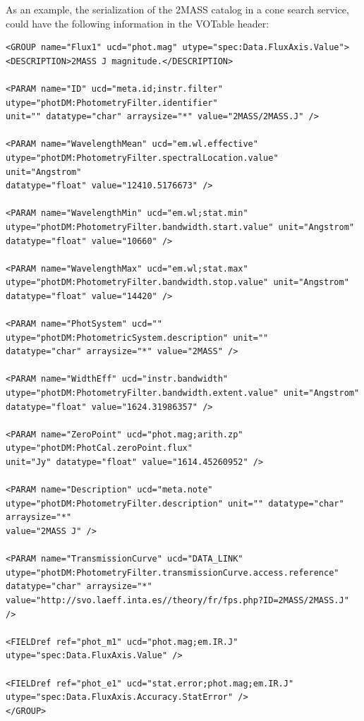 \documentclass[11pt,a4paper]{ivoa}
\begin{document}
\begin{appendices}
As an example, the serialization of the 2MASS catalog in a cone search service, could have the following information in the VOTable header:
\par

\begin{verbatim}
<GROUP name="Flux1" ucd="phot.mag" utype="spec:Data.FluxAxis.Value">
<DESCRIPTION>2MASS J magnitude.</DESCRIPTION>

<PARAM name="ID" ucd="meta.id;instr.filter"
utype="photDM:PhotometryFilter.identifier"
unit="" datatype="char" arraysize="*" value="2MASS/2MASS.J" />

<PARAM name="WavelengthMean" ucd="em.wl.effective"
utype="photDM:PhotometryFilter.spectralLocation.value"
unit="Angstrom"
datatype="float" value="12410.5176673" />

<PARAM name="WavelengthMin" ucd="em.wl;stat.min"
utype="photDM:PhotometryFilter.bandwidth.start.value" unit="Angstrom"
datatype="float" value="10660" />

<PARAM name="WavelengthMax" ucd="em.wl;stat.max"
utype="photDM:PhotometryFilter.bandwidth.stop.value" unit="Angstrom"
datatype="float" value="14420" />

<PARAM name="PhotSystem" ucd="" utype="photDM:PhotometricSystem.description" unit=""
datatype="char" arraysize="*" value="2MASS" />

<PARAM name="WidthEff" ucd="instr.bandwidth"
utype="photDM:PhotometryFilter.bandwidth.extent.value" unit="Angstrom"
datatype="float" value="1624.31986357" />

<PARAM name="ZeroPoint" ucd="phot.mag;arith.zp" utype="photDM:PhotCal.zeroPoint.flux"
unit="Jy" datatype="float" value="1614.45260952" />

<PARAM name="Description" ucd="meta.note"
utype="photDM:PhotometryFilter.description" unit="" datatype="char" arraysize="*"
value="2MASS J" />

<PARAM name="TransmissionCurve" ucd="DATA_LINK"
utype="photDM:PhotometryFilter.transmissionCurve.access.reference"
datatype="char" arraysize="*"
value="http://svo.laeff.inta.es//theory/fr/fps.php?ID=2MASS/2MASS.J" />

<FIELDref ref="phot_m1" ucd="phot.mag;em.IR.J"
utype="spec:Data.FluxAxis.Value" />

<FIELDref ref="phot_e1" ucd="stat.error;phot.mag;em.IR.J"
utype="spec:Data.FluxAxis.Accuracy.StatError" />
</GROUP>

\end{verbatim}




\end{appendices}
\end{document}
